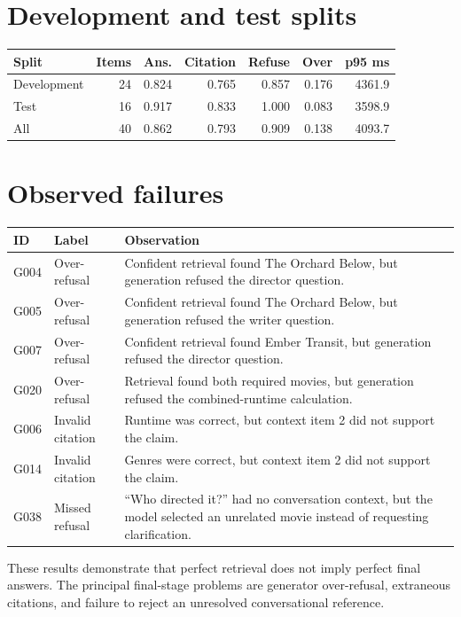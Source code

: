 \documentclass[11pt]{article}
\begin{document}
\section{Development and test splits}

\begin{center}
\small
\begin{tabular}{lrrrrrr}
\hline
Split & Items & Ans. & Citation & Refuse & Over & p95 ms \\
\hline
Development & 24 & 0.824 & 0.765 & 0.857 & 0.176 & 4361.9 \\
Test & 16 & 0.917 & 0.833 & 1.000 & 0.083 & 3598.9 \\
All & 40 & 0.862 & 0.793 & 0.909 & 0.138 & 4093.7 \\
\hline
\end{tabular}
\normalsize
\end{center}

\section{Observed failures}

\begin{longtable}{p{}p{}p{}}
\hline
ID & Label & Observation \\
\hline
G004 & Over-refusal & Confident retrieval found The Orchard Below, but generation refused the director question. \\
G005 & Over-refusal & Confident retrieval found The Orchard Below, but generation refused the writer question. \\
G007 & Over-refusal & Confident retrieval found Ember Transit, but generation refused the director question. \\
G020 & Over-refusal & Retrieval found both required movies, but generation refused the combined-runtime calculation. \\
G006 & Invalid citation & Runtime was correct, but context item 2 did not support the claim. \\
G014 & Invalid citation & Genres were correct, but context item 2 did not support the claim. \\
G038 & Missed refusal & ``Who directed it?'' had no conversation context, but the model selected an unrelated movie instead of requesting clarification. \\
\hline
\end{longtable}

These results demonstrate that perfect retrieval does not imply perfect final
answers. The principal final-stage problems are generator over-refusal,
extraneous citations, and failure to reject an unresolved conversational
reference.
\end{document}
